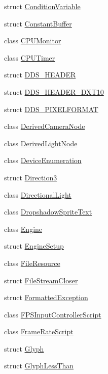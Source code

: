 \begin{DoxyCompactItemize}
struct \hyperlink{structmage_1_1_condition_variable}{Condition\+Variable}
\item 
struct \hyperlink{structmage_1_1_constant_buffer}{Constant\+Buffer}
\item 
class \hyperlink{classmage_1_1_c_p_u_monitor}{C\+P\+U\+Monitor}
\item 
class \hyperlink{classmage_1_1_c_p_u_timer}{C\+P\+U\+Timer}
\item 
struct \hyperlink{structmage_1_1_d_d_s___h_e_a_d_e_r}{D\+D\+S\+\_\+\+H\+E\+A\+D\+ER}
\item 
struct \hyperlink{structmage_1_1_d_d_s___h_e_a_d_e_r___d_x_t10}{D\+D\+S\+\_\+\+H\+E\+A\+D\+E\+R\+\_\+\+D\+X\+T10}
\item 
struct \hyperlink{structmage_1_1_d_d_s___p_i_x_e_l_f_o_r_m_a_t}{D\+D\+S\+\_\+\+P\+I\+X\+E\+L\+F\+O\+R\+M\+AT}
\item 
class \hyperlink{classmage_1_1_derived_camera_node}{Derived\+Camera\+Node}
\item 
class \hyperlink{classmage_1_1_derived_light_node}{Derived\+Light\+Node}
\item 
class \hyperlink{classmage_1_1_device_enumeration}{Device\+Enumeration}
\item 
struct \hyperlink{structmage_1_1_direction3}{Direction3}
\item 
class \hyperlink{classmage_1_1_directional_light}{Directional\+Light}
\item 
class \hyperlink{classmage_1_1_dropshadow_sprite_text}{Dropshadow\+Sprite\+Text}
\item 
class \hyperlink{classmage_1_1_engine}{Engine}
\item 
struct \hyperlink{structmage_1_1_engine_setup}{Engine\+Setup}
\item 
class \hyperlink{classmage_1_1_file_resource}{File\+Resource}
\item 
struct \hyperlink{structmage_1_1_file_stream_closer}{File\+Stream\+Closer}
\item 
struct \hyperlink{structmage_1_1_formatted_exception}{Formatted\+Exception}
\item 
class \hyperlink{classmage_1_1_f_p_s_input_controller_script}{F\+P\+S\+Input\+Controller\+Script}
\item 
class \hyperlink{classmage_1_1_frame_rate_script}{Frame\+Rate\+Script}
\item 
struct \hyperlink{structmage_1_1_glyph}{Glyph}
\item 
struct \hyperlink{structmage_1_1_glyph_less_than}{Glyph\+Less\+Than}
\item 

\end{DoxyCompactItemize}
